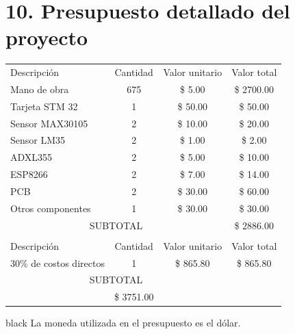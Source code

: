 \documentclass[11pt]{charter}
\begin{document}
\section{10. Presupuesto detallado del proyecto}
\label{sec:presupuesto}
\begin{table}[htpb]
\centering
\begin{tabularx}{\linewidth}{@{}|X|c|r|r|@{}}
\hline
\rowcolor[HTML]{C0C0C0} 
\multicolumn{4}{|c|}{\cellcolor[HTML]{C0C0C0}COSTOS DIRECTOS} \\ \hline
\rowcolor[HTML]{C0C0C0} 
Descripción &
  \multicolumn{1}{c|}{\cellcolor[HTML]{C0C0C0}Cantidad} &
  \multicolumn{1}{c|}{\cellcolor[HTML]{C0C0C0}Valor unitario} &
  \multicolumn{1}{c|}{\cellcolor[HTML]{C0C0C0}Valor total} \\ \hline
Mano de obra  &
  \multicolumn{1}{c|}{675} &
  \multicolumn{1}{c|}{\$ 5.00} &
  \multicolumn{1}{c|}{\$ 2700.00} \\ \hline
Tarjeta STM 32  &
  \multicolumn{1}{c|}{1} &
  \multicolumn{1}{c|}{\$ 50.00} &
  \multicolumn{1}{c|}{\$ 50.00} \\ \hline
Sensor MAX30105 &
  \multicolumn{1}{c|}{2} &
  \multicolumn{1}{c|}{\$ 10.00} &
  \multicolumn{1}{c|}{\$ 20.00} \\ \hline
Sensor LM35 &
  \multicolumn{1}{c|}{2} &
  \multicolumn{1}{c|}{\$ 1.00} &
  \multicolumn{1}{c|}{\$ 2.00} \\ \hline
ADXL355 &
  \multicolumn{1}{c|}{2} &
  \multicolumn{1}{c|}{\$ 5.00} &
  \multicolumn{1}{c|}{\$ 10.00} \\ \hline
ESP8266 &
  \multicolumn{1}{c|}{2} &
  \multicolumn{1}{c|}{\$ 7.00} &
  \multicolumn{1}{c|}{\$ 14.00} \\ \hline
PCB &
  \multicolumn{1}{c|}{2} &
  \multicolumn{1}{c|}{\$ 30.00} &
  \multicolumn{1}{c|}{\$ 60.00} \\ \hline
Otros componentes &
  \multicolumn{1}{c|}{1} &
  \multicolumn{1}{c|}{\$ 30.00} &
  \multicolumn{1}{c|}{\$ 30.00} \\ \hline
\multicolumn{3}{|c|}{SUBTOTAL} &
  \multicolumn{1}{c|}{\$ 2886.00} \\ \hline
\rowcolor[HTML]{C0C0C0} 
\multicolumn{4}{|c|}{\cellcolor[HTML]{C0C0C0}COSTOS INDIRECTOS} \\ \hline
\rowcolor[HTML]{C0C0C0} 
Descripción &
  \multicolumn{1}{c|}{\cellcolor[HTML]{C0C0C0}Cantidad} &
  \multicolumn{1}{c|}{\cellcolor[HTML]{C0C0C0}Valor unitario} &
  \multicolumn{1}{c|}{\cellcolor[HTML]{C0C0C0}Valor total} \\ \hline
30\% de costos directos &
  \multicolumn{1}{c|}{1} &
  \multicolumn{1}{c|}{\$ 865.80} &
  \multicolumn{1}{c|}{\$ 865.80} \\ \hline
\multicolumn{3}{|c|}{SUBTOTAL} &
  \multicolumn{1}{c|}{} \\ \hline
\rowcolor[HTML]{C0C0C0}
\multicolumn{3}{|c|}{TOTAL} & \$ 3751.00
   \\ \hline
\end{tabularx}%
\end{table}
\vspace{10px}
\begin{consigna}{black}
La moneda utilizada en el presupuesto es el dólar.
\end{consigna}
\end{document}
